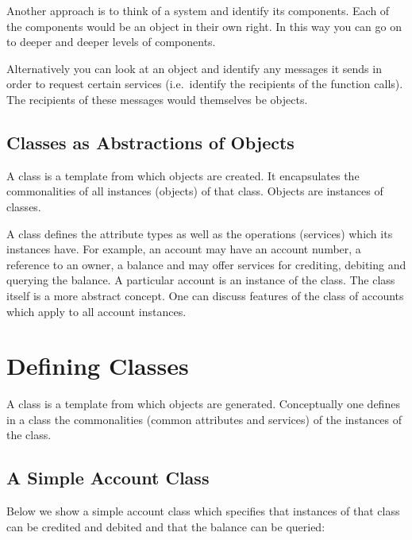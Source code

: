 Another approach is to think of a system and identify its components. Each of the 
components would be an object in their own right. In this way you can go on to
deeper and deeper levels of components.

Alternatively you can look at an object and identify any messages it sends in order
to request certain services (i.e.\ identify the recipients of the function calls).
The recipients of these messages would themselves be objects.


\subsection{Classes as Abstractions of Objects}

A class is a template from which objects are created. It encapsulates the commonalities
of all instances (objects) of that class. Objects are instances of classes.

A class defines the attribute types as well as the operations (services) which 
its instances have. For example, an account may have an account number, a reference
to an owner, a balance and may offer services for crediting, debiting and
querying the balance. A particular account is an instance of the class. The
class itself is a more abstract concept. One can discuss features of the
class of accounts which apply to all account instances.


\section{Defining Classes}

A class is a template from which objects are generated. Conceptually
one defines in a class the commonalities (common attributes and services)
of the instances of the class. 


\subsection{A Simple Account Class \label{secSimpleAccount}}

Below we show a simple account class which specifies that instances of
that class can be credited and debited and that the balance can be queried:

